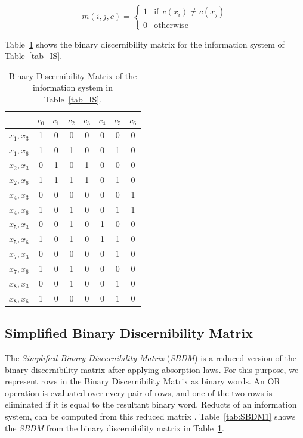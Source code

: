 \documentclass[authoryear,preprint,review,12pt]{elsarticle}
\begin{document}
  \begin{equation}
  	m(i, j, c)=\left\lbrace\begin{array}{cl}
  			1 & \mathrm{if~~}c(x_i) \neq c(x_j) \\%
  			0 								   & \mathrm{otherwise} 
  	\end{array}\right.
  \end{equation} 
  
  Table~\ref{tab_BDM} shows the binary discernibility matrix for the information system of Table~\ref{tab_IS}.  
  
  \begin{table}[htb]
		\caption{Binary Discernibility Matrix of the information system in Table~\ref{tab_IS}.} \label{tab_BDM}
		\centering
 	\begin{tabular}{c|ccccccc}
 		& $c_0$ & $c_1$ & $c_2$ & $c_3$ & $c_4$ & $c_5$ & $c_6$\\
 		\hline
		$x_1,x_3$ & 1 & 0 & 0 & 0 & 0 & 0 & 0 \\
		$x_1,x_6$ & 1 & 0 & 1 & 0 & 0 & 1 & 0 \\
		$x_2,x_3$ & 0 & 1 & 0 & 1 & 0 & 0 & 0 \\
		$x_2,x_6$ & 1 & 1 & 1 & 1 & 0 & 1 & 0 \\
		$x_4,x_3$ & 0 & 0 & 0 & 0 & 0 & 0 & 1 \\
		$x_4,x_6$ & 1 & 0 & 1 & 0 & 0 & 1 & 1 \\
		$x_5,x_3$ & 0 & 0 & 1 & 0 & 1 & 0 & 0 \\
		$x_5,x_6$ & 1 & 0 & 1 & 0 & 1 & 1 & 0 \\
		$x_7,x_3$ & 0 & 0 & 0 & 0 & 0 & 1 & 0 \\
		$x_7,x_6$ & 1 & 0 & 1 & 0 & 0 & 0 & 0 \\
		$x_8,x_3$ & 0 & 0 & 1 & 0 & 0 & 1 & 0 \\
		$x_8,x_6$ & 1 & 0 & 0 & 0 & 0 & 1 & 0 
 	\end{tabular}             
  \end{table}

\subsection{Simplified Binary Discernibility Matrix}\label{sect_SBDM}
  The \textit{Simplified Binary Discernibility Matrix} (\textit{SBDM}) is a reduced version of the binary discernibility matrix after applying absorption laws. For this purpose, we represent rows in the Binary Discernibility Matrix as binary words. An OR operation is evaluated over every pair of rows, and one of the two rows is eliminated if it is equal to the resultant binary word. Reducts of an information system, can be computed from this reduced matrix \citep{Yao09}. Table~\ref{tab:SBDM1} shows the \textit{SBDM} from the binary discernibility matrix in Table~\ref{tab_BDM}.
  
\end{document}
